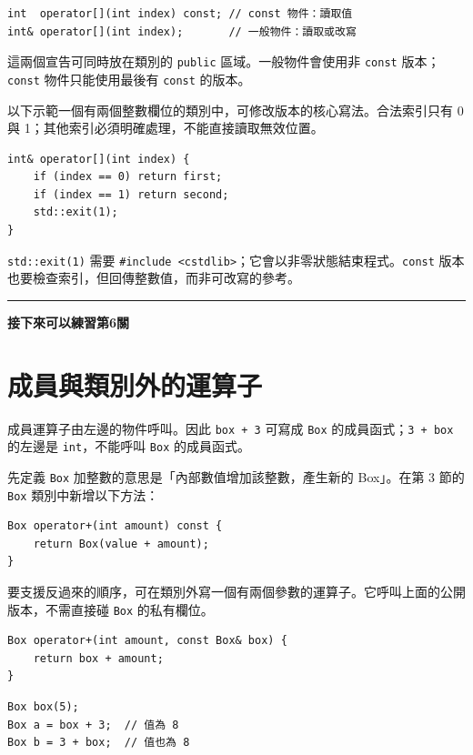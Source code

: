 \documentclass[12pt,a4paper]{article}
\newcommand{\practice}[1]{%
  \Needspace{3\baselineskip}%
  \par\vspace{0.6em}\noindent\rule{\linewidth}{0.3pt}\par
  \noindent\textbf{接下來可以練習第#1關}\par
}
\begin{document}
\begin{lstlisting}
int  operator[](int index) const; // const 物件：讀取值
int& operator[](int index);       // 一般物件：讀取或改寫
\end{lstlisting}

這兩個宣告可同時放在類別的 \texttt{public} 區域。一般物件會使用非 \texttt{const} 版本；\texttt{const} 物件只能使用最後有 \texttt{const} 的版本。

以下示範一個有兩個整數欄位的類別中，可修改版本的核心寫法。合法索引只有 0 與 1；其他索引必須明確處理，不能直接讀取無效位置。

\begin{lstlisting}
int& operator[](int index) {
    if (index == 0) return first;
    if (index == 1) return second;
    std::exit(1);
}
\end{lstlisting}

\texttt{std::exit(1)} 需要 \texttt{\#include <cstdlib>}；它會以非零狀態結束程式。\texttt{const} 版本也要檢查索引，但回傳整數值，而非可改寫的參考。

\practice{6}

\clearpage
\section{成員與類別外的運算子}

成員運算子由左邊的物件呼叫。因此 \texttt{box + 3} 可寫成 \texttt{Box} 的成員函式；\texttt{3 + box} 的左邊是 \texttt{int}，不能呼叫 \texttt{Box} 的成員函式。

先定義 \texttt{Box} 加整數的意思是「內部數值增加該整數，產生新的 Box」。在第 3 節的 \texttt{Box} 類別中新增以下方法：

\begin{lstlisting}
Box operator+(int amount) const {
    return Box(value + amount);
}
\end{lstlisting}

要支援反過來的順序，可在類別外寫一個有兩個參數的運算子。它呼叫上面的公開版本，不需直接碰 \texttt{Box} 的私有欄位。

\begin{lstlisting}
Box operator+(int amount, const Box& box) {
    return box + amount;
}
\end{lstlisting}

\begin{lstlisting}
Box box(5);
Box a = box + 3;  // 值為 8
Box b = 3 + box;  // 值也為 8
\end{lstlisting}
\end{document}
